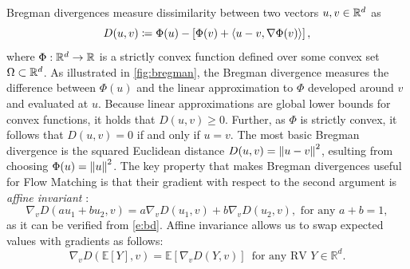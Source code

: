 \documentclass{fairmeta}
\numberwithin{equation}{section}
\begin{document}
Bregman divergences measure dissimilarity between two vectors $u,v\in\mathbb R^d$ as 
\begin{equation}\label{e:bd}
    D(u,v) \coloneqq \Phi(u) - \left [ \Phi(v) + \left \langle u-v, \nabla \Phi(v) \right \rangle \right ],
\end{equation}
where $\Phi:\mathbb R^d\rightarrow\mathbb R$ is a strictly convex function defined over some convex set $\Omega\subset\mathbb R^d$.
As illustrated in \cref{fig:bregman}, the Bregman divergence measures the difference between $\Phi(u)$ and the linear approximation to $\Phi$ developed around $v$ and evaluated at $u$.
Because linear approximations are global lower bounds for convex functions, it holds that $D(u,v)\geq 0$. Further, as $\Phi$ is strictly convex, it follows that $D(u,v)=0$ if and only if $u=v$.
The most basic Bregman divergence is the squared Euclidean distance $D(u,v) = \left\Vert u-v\right\Vert^2$, esulting from choosing $\Phi(u)=\left\Vert u\right\Vert^2$.
The key property that makes Bregman divergences useful for Flow Matching is that their gradient with respect to the second argument is \emph{affine invariant} \citep{holderrieth2024gm}:
\begin{equation}\label{e:bd_affine_grad}
    \nabla_v D(au_1 + bu_2, v) = a\nabla_v D(u_1,v) + b\nabla_v D(u_2,v), \text{ for any } a+b=1,
\end{equation}
as it can be verified from \cref{e:bd}. Affine invariance allows us to swap expected values with gradients as follows: 
\begin{equation}\label{e:swap_grad_and_exp}
    \nabla_v D(\mathbb{E}[Y], v) = \mathbb{E}[\nabla_v D(Y, v)]\, \text{ for any RV } Y\in\mathbb{R}^d.
\end{equation}
\end{document}
